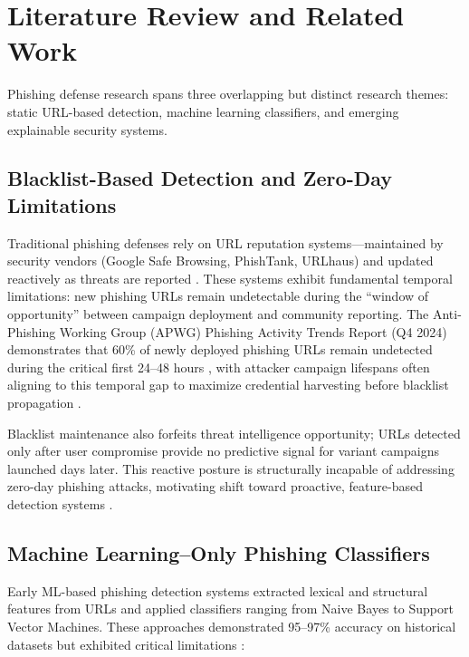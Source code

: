 \documentclass[conference]{IEEEtran}
\begin{document}
\section{Literature Review and Related Work}

Phishing defense research spans three overlapping but distinct research themes: static URL-based detection, machine learning classifiers, and emerging explainable security systems.

\subsection{Blacklist-Based Detection and Zero-Day Limitations}

Traditional phishing defenses rely on URL reputation systems—maintained by security vendors (Google Safe Browsing, PhishTank, URLhaus) and updated reactively as threats are reported \cite{b5}. These systems exhibit fundamental temporal limitations: new phishing URLs remain undetectable during the ``window of opportunity'' between campaign deployment and community reporting. The Anti-Phishing Working Group (APWG) Phishing Activity Trends Report (Q4 2024) demonstrates that 60\% of newly deployed phishing URLs remain undetected during the critical first 24–48 hours \cite{b6}, with attacker campaign lifespans often aligning to this temporal gap to maximize credential harvesting before blacklist propagation \cite{b7}.

Blacklist maintenance also forfeits threat intelligence opportunity; URLs detected only after user compromise provide no predictive signal for variant campaigns launched days later. This reactive posture is structurally incapable of addressing zero-day phishing attacks, motivating shift toward proactive, feature-based detection systems \cite{b8}.

\subsection{Machine Learning–Only Phishing Classifiers}

Early ML-based phishing detection systems extracted lexical and structural features from URLs and applied classifiers ranging from Naive Bayes to Support Vector Machines. These approaches demonstrated 95–97\% accuracy on historical datasets but exhibited critical limitations \cite{b9}:
\end{document}
